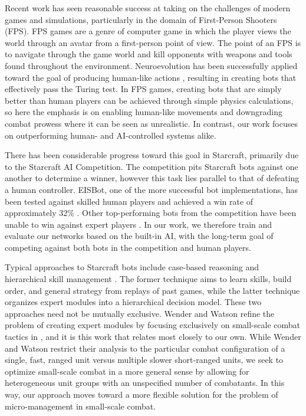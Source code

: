 \documentclass[10pt,a4paper,twocolumn]{article}
\begin{document}
Recent work has seen reasonable success at taking on the challenges of modern games and simulations, particularly in the domain of First-Person Shooters (FPS). FPS games are a genre of computer game in which the player views the world through an avatar from a first-person point of view. The point of an FPS is to navigate through the game world and kill opponents with weapons and tools found throughout the environment. Neuroevolution has been successfully applied toward the goal of producing human-like actions \cite{schrum:cig11competition}, resulting in creating bots that effectively pass the Turing test. In FPS games, creating bots that are simply better than human players can be achieved through simple physics calculations, so here the emphasis is on enabling human-like movements and downgrading combat prowess where it can be seen as unrealistic. In contrast, our work focuses on outperforming human- and AI-controlled systems alike.

There has been considerable progress toward this goal in Starcraft, primarily due to the Starcraft AI Competition. The competition pits Starcraft bots against one another to determine a winner, however this task lies parallel to that of defeating a human controller. EISBot, one of the more successful bot implementations, has been tested against skilled human players and achieved a win rate of approximately 32\% \cite{weber2011building}. Other top-performing bots from the competition have been unable to win against expert players \cite{ai_comp_2010_website}. In our work, we therefore train and evaluate our networks based on the built-in AI, with the long-term goal of competing against both bots in the competition and human players.

Typical approaches to Starcraft bots include case-based reasoning \cite{weber2009case, weber2010case, cadena2011fuzzy} and hierarchical skill management \cite{mccoy2008integrated}. The former technique aims to learn skills, build order, and general strategy from replays of past games, while the latter technique organizes expert modules into a hierarchical decision model. These two approaches need not be mutually exclusive. Wender and Watson refine the problem of creating expert modules by focusing exclusively on small-scale combat tactics in \cite{rl_small_scale_combat}, and it is this work that relates most closely to our own. While Wender and Watson restrict their analysis to the particular combat configuration of a single, fast, ranged unit versus multiple slower short-ranged units, we seek to optimize small-scale combat in a more general sense by allowing for heterogeneous unit groups with an unspecified number of combatants. In this way, our approach moves toward a more flexible solution for the problem of micro-management in small-scale combat. 
\end{document}
